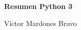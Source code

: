 \begin{titlepage}
  \begin{center}
    \vspace*{8cm}
    
    \def\svgwidth{\columnwidth}
    

    \vspace{2cm}

    \Huge
    \textbf{Resumen Python 3}

    \vspace{1cm}
    
    \LARGE
    Víctor Mardones Bravo

    \vfill

  \end{center}
\end{titlepage}

\clearpage